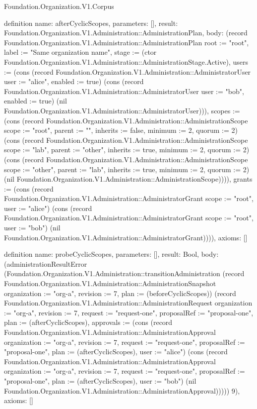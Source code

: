 \begin{lexlean}{Foundation.Organization.V1.Corpus}
\begin{semanticmodule}
definition{
  name: afterCyclicScopes,
  parameters: [],
  result: Foundation.Organization.V1.Administration::AdministrationPlan,
  body: (record Foundation.Organization.V1.Administration::AdministrationPlan {root := "root", label := "Same organization name", stage := (ctor Foundation.Organization.V1.Administration::AdministrationStage.Active), users := (cons (record Foundation.Organization.V1.Administration::AdministratorUser {user := "alice", enabled := true}) (cons (record Foundation.Organization.V1.Administration::AdministratorUser {user := "bob", enabled := true}) (nil Foundation.Organization.V1.Administration::AdministratorUser))), scopes := (cons (record Foundation.Organization.V1.Administration::AdministrationScope {scope := "root", parent := "", inherits := false, minimum := 2, quorum := 2}) (cons (record Foundation.Organization.V1.Administration::AdministrationScope {scope := "lab", parent := "other", inherits := true, minimum := 2, quorum := 2}) (cons (record Foundation.Organization.V1.Administration::AdministrationScope {scope := "other", parent := "lab", inherits := true, minimum := 2, quorum := 2}) (nil Foundation.Organization.V1.Administration::AdministrationScope)))), grants := (cons (record Foundation.Organization.V1.Administration::AdministratorGrant {scope := "root", user := "alice"}) (cons (record Foundation.Organization.V1.Administration::AdministratorGrant {scope := "root", user := "bob"}) (nil Foundation.Organization.V1.Administration::AdministratorGrant)))}),
  axioms: []
}

definition{
  name: probeCyclicScopes,
  parameters: [],
  result: Bool,
  body: (administrationResultError (Foundation.Organization.V1.Administration::transitionAdministration (record Foundation.Organization.V1.Administration::AdministrationSnapshot {organization := "org-a", revision := 7, plan := (beforeCyclicScopes)}) (record Foundation.Organization.V1.Administration::AdministrationRequest {organization := "org-a", revision := 7, request := "request-one", proposalRef := "proposal-one", plan := (afterCyclicScopes), approvals := (cons (record Foundation.Organization.V1.Administration::AdministrationApproval {organization := "org-a", revision := 7, request := "request-one", proposalRef := "proposal-one", plan := (afterCyclicScopes), user := "alice"}) (cons (record Foundation.Organization.V1.Administration::AdministrationApproval {organization := "org-a", revision := 7, request := "request-one", proposalRef := "proposal-one", plan := (afterCyclicScopes), user := "bob"}) (nil Foundation.Organization.V1.Administration::AdministrationApproval)))})) 9),
  axioms: []
}


\end{semanticmodule}
\end{lexlean}
